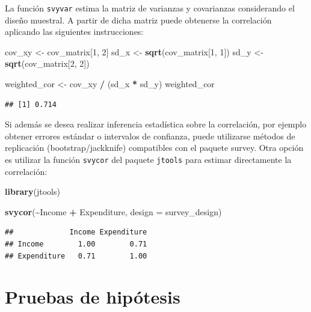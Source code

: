 \documentclass[
  spanish,
  12pt,
]{book}
\newenvironment{Shaded}{\begin{snugshade}}{\end{snugshade}}
\newcommand{\AttributeTok}[1]{\textcolor[rgb]{0.13,0.29,0.53}{#1}}
\newcommand{\DecValTok}[1]{\textcolor[rgb]{0.00,0.00,0.81}{#1}}
\newcommand{\FunctionTok}[1]{\textcolor[rgb]{0.13,0.29,0.53}{\textbf{#1}}}
\newcommand{\NormalTok}[1]{#1}
\newcommand{\OtherTok}[1]{\textcolor[rgb]{0.56,0.35,0.01}{#1}}
\newcommand{\SpecialCharTok}[1]{\textcolor[rgb]{0.81,0.36,0.00}{\textbf{#1}}}
\begin{document}
La función \texttt{svyvar} estima la matriz de varianzas y covarianzas considerando el diseño muestral. A partir de dicha matriz puede obtenerse la correlación aplicando las siguientes instrucciones:

\begin{Shaded}
\begin{Highlighting}[]
\NormalTok{cov\_xy }\OtherTok{\textless{}{-}}\NormalTok{ cov\_matrix[}\DecValTok{1}\NormalTok{, }\DecValTok{2}\NormalTok{]}
\NormalTok{sd\_x }\OtherTok{\textless{}{-}} \FunctionTok{sqrt}\NormalTok{(cov\_matrix[}\DecValTok{1}\NormalTok{, }\DecValTok{1}\NormalTok{])}
\NormalTok{sd\_y }\OtherTok{\textless{}{-}} \FunctionTok{sqrt}\NormalTok{(cov\_matrix[}\DecValTok{2}\NormalTok{, }\DecValTok{2}\NormalTok{])}

\NormalTok{weighted\_cor }\OtherTok{\textless{}{-}}\NormalTok{ cov\_xy }\SpecialCharTok{/}\NormalTok{ (sd\_x }\SpecialCharTok{*}\NormalTok{ sd\_y)}
\NormalTok{weighted\_cor}
\end{Highlighting}
\end{Shaded}

\begin{verbatim}
## [1] 0.714
\end{verbatim}

Si además se desea realizar inferencia estadística sobre la correlación, por ejemplo obtener errores estándar o intervalos de confianza, puede utilizarse métodos de replicación (bootstrap/jackknife) compatibles con el paquete survey. Otra opción es utilizar la función \texttt{svycor} del paquete \texttt{jtools} para estimar directamente la correlación:

\begin{Shaded}
\begin{Highlighting}[]
\FunctionTok{library}\NormalTok{(jtools)}

\FunctionTok{svycor}\NormalTok{(}\SpecialCharTok{\textasciitilde{}}\NormalTok{Income }\SpecialCharTok{+}\NormalTok{ Expenditure, }\AttributeTok{design =}\NormalTok{ survey\_design)}
\end{Highlighting}
\end{Shaded}

\begin{verbatim}
##             Income Expenditure
## Income        1.00        0.71
## Expenditure   0.71        1.00
\end{verbatim}

\section{Pruebas de hipótesis}\label{pruebas-de-hipotesis}
\end{document}
